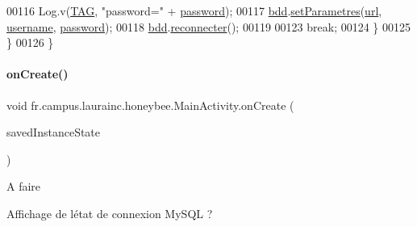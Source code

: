 \begin{DoxyCode}
00116                     Log.v(\hyperlink{classfr_1_1campus_1_1laurainc_1_1honeybee_1_1_main_activity_a70b298f4dd3653ab3d15399d84f96fa9}{TAG}, \textcolor{stringliteral}{"password="} + \hyperlink{classfr_1_1campus_1_1laurainc_1_1honeybee_1_1_main_activity_a3cc5f979af0f495f346052f51bd8cd66}{password});
00117                     \hyperlink{classfr_1_1campus_1_1laurainc_1_1honeybee_1_1_main_activity_ae01aec19dc79f2c48d1807ccb2d3fa4a}{bdd}.\hyperlink{classfr_1_1campus_1_1laurainc_1_1honeybee_1_1_base_de_donnees_a0960cb9d71647e80e195a580f90cd0d6}{setParametres}(\hyperlink{classfr_1_1campus_1_1laurainc_1_1honeybee_1_1_main_activity_adbea1c677048c193ef00a08987905bfa}{url}, \hyperlink{classfr_1_1campus_1_1laurainc_1_1honeybee_1_1_main_activity_a1acb2db3f66e167ea225e281d900f842}{username}, 
      \hyperlink{classfr_1_1campus_1_1laurainc_1_1honeybee_1_1_main_activity_a3cc5f979af0f495f346052f51bd8cd66}{password});
00118                     \hyperlink{classfr_1_1campus_1_1laurainc_1_1honeybee_1_1_main_activity_ae01aec19dc79f2c48d1807ccb2d3fa4a}{bdd}.\hyperlink{classfr_1_1campus_1_1laurainc_1_1honeybee_1_1_base_de_donnees_a89357a1cc8a3648400df37a8bfe95958}{reconnecter}();
00119 
00123                     \textcolor{keywordflow}{break};
00124             \}
00125         \}
00126     \}
\end{DoxyCode}
\mbox{\label{classfr_1_1campus_1_1laurainc_1_1honeybee_1_1_main_activity_aba2e570bbba3bf1be8487068d9c6c2da}} 
\paragraph{\texorpdfstring{on\+Create()}{onCreate()}}
{\footnotesize\ttfamily void fr.\+campus.\+laurainc.\+honeybee.\+Main\+Activity.\+on\+Create (\begin{DoxyParamCaption}\item[{Bundle}]{saved\+Instance\+State }\end{DoxyParamCaption})\hspace{0.3cm}{\ttfamily [protected]}}

\begin{DoxyRefDesc}{A faire}
\item[\hyperlink{todo__todo000002}{A faire}]Affichage de l\textquotesingle{}état de connexion My\+S\+QL ? \end{DoxyRefDesc}


